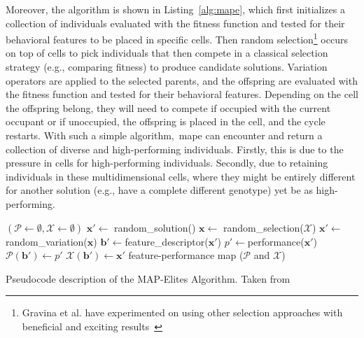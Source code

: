 Moreover, the algorithm is shown in Listing~\ref{alg:mape}, which first initializes a collection of individuals evaluated with the fitness function and tested for their behavioral features to be placed in specific cells. Then random selection\footnote{Gravina et al. have experimented on using other selection approaches with beneficial and exciting results~\cite{gravina_blending_2019}} occurs on top of cells to pick individuals that then compete in a classical selection strategy (e.g., comparing fitness) to produce candidate solutions. Variation operators are applied to the selected parents, and the offspring are evaluated with the fitness function and tested for their behavioral features. Depending on the cell the offspring belong, they will need to compete if occupied with the current occupant or if unoccupied, the offspring is placed in the cell, and the cycle restarts. With such a simple algorithm,~\acrshort{mape} can encounter and return a collection of diverse and high-performing individuals. Firstly, this is due to the pressure in cells for high-performing individuals. Secondly, due to retaining individuals in these multidimensional cells, where they might be entirely different for another solution (e.g., have a complete different genotype) yet be as high-performing.


\begin{algorithm}
\begin{algorithmic}
\State $(\mathcal{P} \leftarrow \emptyset, \mathcal{X} \leftarrow \emptyset)$
  \State $\mathbf{x'}\leftarrow $ random\_solution()  
\Else 
  \State $\mathbf{x}\leftarrow $ random\_selection($\mathcal{X}$) 
  \State $\mathbf{x'}\leftarrow $ random\_variation($\mathbf{x}$) 
\EndIf
\State $\mathbf{b'}\leftarrow $feature\_descriptor($\mathbf{x'}$) 
\State $p'\leftarrow $performance($\mathbf{x'}$) 
\State $\mathcal{P}(\mathbf{b'})\leftarrow p'$ 
\State $\mathcal{X}(\mathbf{b'})\leftarrow \mathbf{x'}$ 
\EndIf
\EndFor
\State \Return feature-performance map ($\mathcal{P}$ and $\mathcal{X}$)
\EndProcedure
\end{algorithmic}
\caption{Pseudocode description of the MAP-Elites Algorithm. Taken from~\cite{mouret_illuminating_2015}}
\label{alg:mape}
\end{algorithm}


